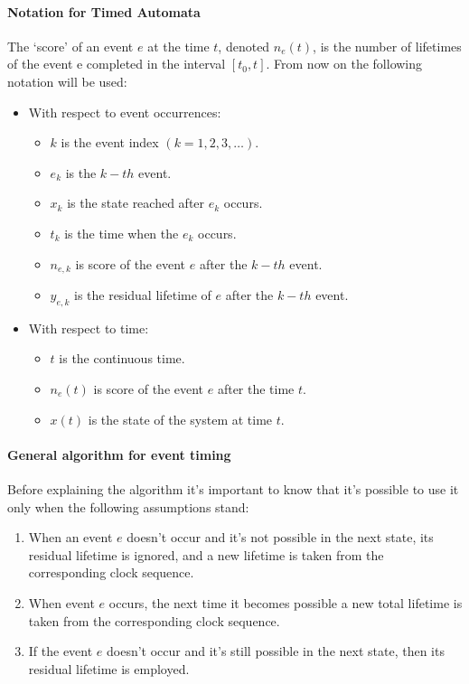 \documentclass[12pt,a4paper]{article}
\begin{document}
\paragraph{Notation for Timed Automata}
The `score’ of an event $e$ at the time $t$, denoted $n_e (t)$, is the number of lifetimes of the event e completed in the interval $[t_0,t]$. From now on the following notation will be used:
\begin{itemize}
\item With respect to event occurrences:
	\begin{itemize}
	\item $k$ is the event index $(k=1,2,3,\dots)$.
	\item $e_k$ is the $k-th$ event.
	\item $x_k$ is the state reached after $e_k$ occurs.
	\item $t_k$ is the time when the $e_k$ occurs.
	\item $n_{e,k}$ is score of the event $e$ after the $k-th$ event.
	\item $y_{e,k}$ is the residual lifetime of $e$ after the $k-th$ event.
	\end{itemize} 
\item With respect to time:
	\begin{itemize}
	\item $t$ is the continuous time.
	\item $n_{e}(t)$ is score of the event $e$ after the time $t$.
	\item $x(t)$ is the state of the system at time $t$.
	\end{itemize} 
\end{itemize}
\paragraph{General algorithm for event timing} Before explaining the algorithm it’s important to know that it’s possible to use it only when the following assumptions stand:
\begin{enumerate}
\item When an event $e$ doesn’t occur and it’s not possible in the next state, its residual lifetime is ignored, and a new lifetime is taken from the corresponding clock sequence.
\item When event $e$ occurs, the next time it becomes possible a new total lifetime is taken from the corresponding clock sequence.
\item If the event $e$ doesn’t occur and it’s still possible in the next state, then its residual lifetime is employed.
\end{enumerate}
 
\end{document}

